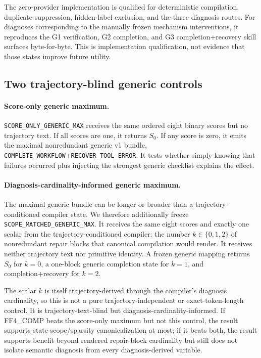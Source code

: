 The zero-provider implementation is qualified for deterministic compilation, duplicate suppression, hidden-label exclusion, and the three diagnosis routes. For diagnoses corresponding to the manually frozen mechanism interventions, it reproduces the G1 verification, G2 completion, and G3 completion+recovery skill surfaces byte-for-byte. This is implementation qualification, not evidence that those states improve future utility.

\subsection{Two trajectory-blind generic controls}

\paragraph{Score-only generic maximum.}
\texttt{SCORE\_ONLY\_GENERIC\_MAX} receives the same ordered eight binary scores but no trajectory text. If all scores are one, it returns $S_0$. If any score is zero, it emits the maximal nonredundant generic v1 bundle, \texttt{COMPLETE\_WORKFLOW}+\texttt{RECOVER\_TOOL\_ERROR}. It tests whether simply knowing that failures occurred plus injecting the strongest generic checklist explains the effect.

\paragraph{Diagnosis-cardinality-informed generic maximum.}
The maximal generic bundle can be longer or broader than a trajectory-conditioned compiler state. We therefore additionally freeze \texttt{SCOPE\_MATCHED\_GENERIC\_MAX}. It receives the same eight scores and exactly one scalar from the trajectory-conditioned compiler: the number $k\in\{0,1,2\}$ of nonredundant repair blocks that canonical compilation would render. It receives neither trajectory text nor primitive identity. A frozen generic mapping returns $S_0$ for $k=0$, a one-block generic completion state for $k=1$, and completion+recovery for $k=2$.

The scalar $k$ is itself trajectory-derived through the compiler's diagnosis cardinality, so this is not a pure trajectory-independent or exact-token-length control. It is trajectory-text-blind but diagnosis-cardinality-informed. If FF4\_COMP beats the score-only maximum but not this control, the result supports state scope/sparsity canonicalization at most; if it beats both, the result supports benefit beyond rendered repair-block cardinality but still does not isolate semantic diagnosis from every diagnosis-derived variable.


